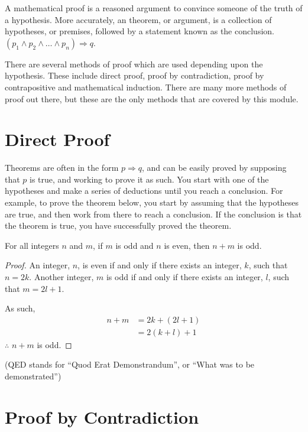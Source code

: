 
A mathematical proof is a reasoned argument to convince someone of the truth of a hypothesis. More accurately, an
 theorem, or argument, is a collection of hypotheses, or premises, followed by a statement known as the conclusion.
 $(p_1 \wedge p_2 \wedge \dots \wedge p_n) \Rightarrow q$.

There are several methods of proof which are used depending upon the hypothesis. These include direct proof, proof by
 contradiction, proof by contrapositive and mathematical induction. There are many more methods of proof out there, but
 these are the only methods that are covered by this module.

\section*{Direct Proof}

Theorems are often in the form $p \Rightarrow q$, and can be easily proved by supposing that $p$ is true, and working
 to prove it as such. You start with one of the hypotheses and make a series of deductions until you reach a conclusion.
 For example, to prove the theorem below, you start by assuming that the hypotheses are true, and then work from there
 to reach a conclusion. If the conclusion is that the theorem is true, you have successfully proved the theorem.
\begin{theorem}
For all integers $n$ and $m$, if $m$ is odd and $n$ is even, then $n+m$ is odd.
\end{theorem}

\begin{proof}
An integer, $n$, is even if and only if there exists an integer, $k$, such that $n = 2k$. Another integer, $m$ is odd if
 and only if there exists an integer, $l$, such that $m = 2l + 1$.

As such,
\begin{align*}
  n + m & = 2k + (2l + 1) \\
  & = 2(k + l) + 1 
\end{align*}
$\therefore$ $n + m$ is odd.
\end{proof}

(QED stands for ``Quod Erat Demonstrandum'', or ``What was to be demonstrated'')

\section*{Proof by Contradiction}

